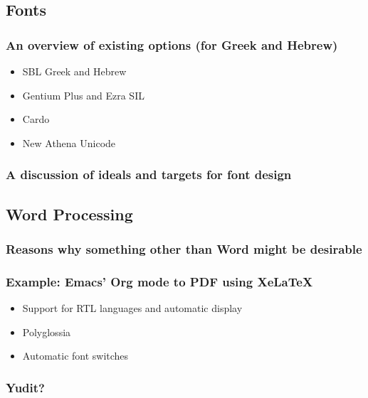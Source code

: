 \documentclass[11pt]{article}
\begin{document}
\subsection{Fonts}
\label{sec:orga1c3bbb}

\subsubsection{An overview of existing options (for Greek and Hebrew)}
\label{sec:org2a7d56f}

\begin{itemize}
\item SBL Greek and Hebrew
\item Gentium Plus and Ezra SIL
\item Cardo
\item New Athena Unicode
\end{itemize}

\subsubsection{A discussion of ideals and targets for font design}
\label{sec:org5e7b14b}

\subsection{Word Processing}
\label{sec:org180305a}

\subsubsection{Reasons why something other than Word might be desirable}
\label{sec:org3ff0e56}

\subsubsection{Example: Emacs' Org mode to PDF using XeLaTeX}
\label{sec:org051f7a3}

\begin{itemize}
\item Support for RTL languages and automatic display
\item Polyglossia
\item Automatic font switches
\end{itemize}

\subsubsection{Yudit?}
\label{sec:orgc86d90b}
\end{document}
